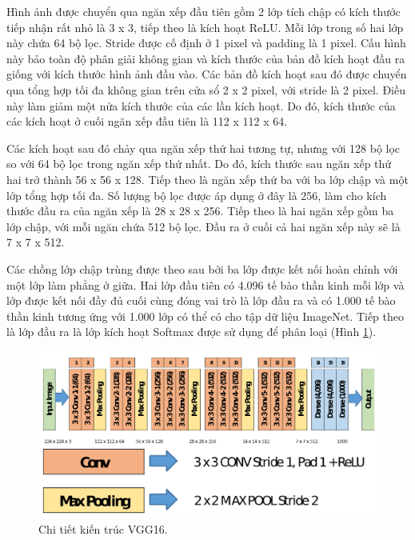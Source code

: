 Hình ảnh được chuyển qua ngăn xếp đầu tiên gồm 2 lớp tích chập có kích thước tiếp nhận rất nhỏ là 3 x 3, tiếp theo là kích hoạt ReLU. Mỗi lớp trong số hai lớp này chứa 64 bộ lọc. Stride được cố định ở 1 pixel và padding là 1 pixel. Cấu hình này bảo toàn độ phân giải không gian và kích thước của bản đồ kích hoạt đầu ra giống với kích thước hình ảnh đầu vào. Các bản đồ kích hoạt sau đó được chuyển qua tổng hợp tối đa không gian trên cửa sổ 2 x 2 pixel, với stride là 2 pixel. Điều này làm giảm một nửa kích thước của các lần kích hoạt. Do đó, kích thước của các kích hoạt ở cuối ngăn xếp đầu tiên là 112 x 112 x 64.

Các kích hoạt sau đó chảy qua ngăn xếp thứ hai tương tự, nhưng với 128 bộ lọc so với 64 bộ lọc trong ngăn xếp thứ nhất. Do đó, kích thước sau ngăn xếp thứ hai trở thành 56 x 56 x 128. Tiếp theo là ngăn xếp thứ ba với ba lớp chập và một lớp tổng hợp tối đa. Số lượng bộ lọc được áp dụng ở đây là 256, làm cho kích thước đầu ra của ngăn xếp là 28 x 28 x 256. Tiếp theo là hai ngăn xếp gồm ba lớp chập, với mỗi ngăn chứa 512 bộ lọc. Đầu ra ở cuối cả hai ngăn xếp này sẽ là 7 x 7 x 512.

Các chồng lớp chập trùng được theo sau bởi ba lớp được kết nối hoàn chỉnh với một lớp làm phẳng ở giữa. Hai lớp đầu tiên có 4.096 tế bào thần kinh mỗi lớp và lớp được kết nối đầy đủ cuối cùng đóng vai trò là lớp đầu ra và có 1.000 tế bào thần kinh tương ứng với 1.000 lớp có thể có cho tập dữ liệu ImageNet. Tiếp theo là lớp đầu ra là lớp kích hoạt Softmax được sử dụng để phân loại (Hình \ref{fig:vgg16_imagenet_detail}).

\begin{figure}[H]
	\centering
	\includegraphics[width=1\linewidth]{images/vgg16_imagenet_detail}
	\caption{Chi tiết kiến trúc VGG16.}
	\label{fig:vgg16_imagenet_detail}
\end{figure}

